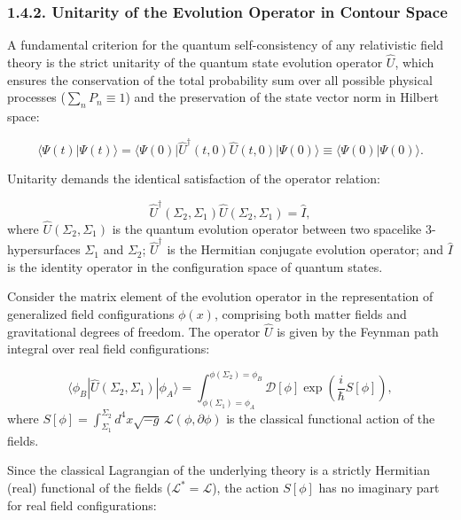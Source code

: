 \subsubsection{1.4.2. Unitarity of the Evolution Operator in Contour Space}\label{sec:1.4.2}

A fundamental criterion for the quantum self-consistency of any relativistic field theory is the strict unitarity of the quantum state evolution operator $\hat{U}$, which ensures the conservation of the total probability sum over all possible physical processes ($\sum_n P_n \equiv 1$) and the preservation of the state vector norm in Hilbert space:

\begin{equation}\label{eq:1.74}\tag{1.74}
\langle \Psi(t) | \Psi(t) \rangle = \langle \Psi(0) | \hat{U}^\dagger(t, 0) \hat{U}(t, 0) | \Psi(0) \rangle \equiv \langle \Psi(0) | \Psi(0) \rangle.
\end{equation}

Unitarity demands the identical satisfaction of the operator relation:

\begin{equation}\label{eq:1.75}\tag{1.75}
\hat{U}^\dagger(\Sigma_2, \Sigma_1) \hat{U}(\Sigma_2, \Sigma_1) = \hat{I},
\end{equation}
where $\hat{U}(\Sigma_2, \Sigma_1)$ is the quantum evolution operator between two spacelike 3-hypersurfaces $\Sigma_1$ and $\Sigma_2$; $\hat{U}^\dagger$ is the Hermitian conjugate evolution operator; and $\hat{I}$ is the identity operator in the configuration space of quantum states.

Consider the matrix element of the evolution operator in the representation of generalized field configurations $\phi(x)$, comprising both matter fields and gravitational degrees of freedom. The operator $\hat{U}$ is given by the Feynman path integral over real field configurations:

\begin{equation}\label{eq:1.76}\tag{1.76}
\langle \phi_B | \hat{U}(\Sigma_2, \Sigma_1) | \phi_A \rangle = \int_{\phi(\Sigma_1)=\phi_A}^{\phi(\Sigma_2)=\phi_B} \mathcal{D}[\phi] \exp\left( \frac{i}{\hbar} S[\phi] \right),
\end{equation}
where $S[\phi] = \int_{\Sigma_1}^{\Sigma_2} d^4x \sqrt{-g} \, \mathcal{L}(\phi, \partial\phi)$ is the classical functional action of the fields.

Since the classical Lagrangian of the underlying theory is a strictly Hermitian (real) functional of the fields ($\mathcal{L}^* = \mathcal{L}$), the action $S[\phi]$ has no imaginary part for real field configurations:

